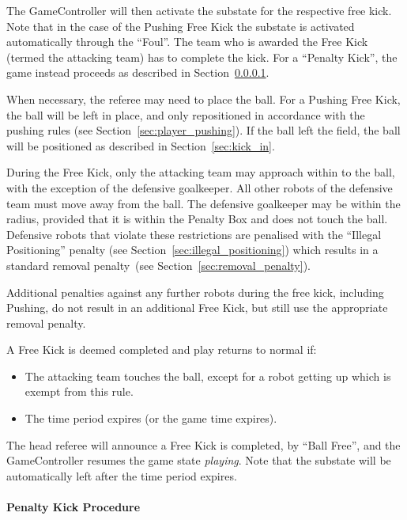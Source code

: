 The GameController will then activate the substate for the respective free kick. Note that in the case of the Pushing Free Kick the substate is activated automatically through the ``Foul''. The team who is awarded the Free Kick (termed the attacking team) has \FreeKickTime to complete the kick. For a ``Penalty Kick'', the game instead proceeds as described in Section~\ref{sec:penalty_free_kick}.

When necessary, the referee may need to place the ball. For a Pushing Free Kick, the ball will be left in place, and only repositioned in accordance with the pushing rules (see Section~\ref{sec:player_pushing}). If the ball left the field, the ball will be positioned as described in Section~\ref{sec:kick_in}.

During the Free Kick, only the attacking team may approach within \FreeKickRadius to the ball, with the exception of the defensive goalkeeper. All other robots of the defensive team must move away from the ball. The defensive goalkeeper may be within the \FreeKickRadius radius, provided that it is within the Penalty Box and does not touch the ball.\\
Defensive robots that violate these restrictions are penalised with the ``Illegal Positioning'' penalty (see Section~\ref{sec:illegal_positioning}) which results in a standard removal penalty~(see Section~\ref{sec:removal_penalty}).

Additional penalties against any further robots during the free kick, including Pushing, do not result in an additional Free Kick, but still use the appropriate removal penalty.

A Free Kick is deemed completed and play returns to normal if:
\begin{itemize}
    \item The attacking team touches the ball, except for a robot getting up which is exempt from this rule.
    \item The \FreeKickTime time period expires (or the game time expires).
\end{itemize}
The head referee will announce a Free Kick is completed, by ``Ball Free'', and the GameController resumes the game state \emph{playing}. Note that the substate will be automatically left after the \FreeKickTime time period expires.

\paragraph{Penalty Kick Procedure}
\label{sec:penalty_free_kick}

